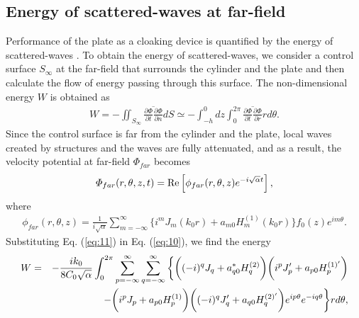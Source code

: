 \documentclass{jfm}
\def\f{\frac}
\def\a{\alpha}
\begin{document}
\subsection{Energy of scattered-waves at far-field}
Performance of the plate as a cloaking device is quantified by the energy of scattered-waves \cite[]{Iida2014}.
To obtain the energy of scattered-waves, we consider a control surface $S_\infty$ at the far-field that surrounds the cylinder and the plate and then calculate the flow of energy passing through this surface.
The non-dimensional energy $W$ is obtained \cite[]{Maruo1960, Kashiwagi2005} as
\begin{eqnarray}
\displaystyle W=-\iint_{S_\infty}\overline{\frac{\partial \Phi}{\partial t}\frac{\partial \Phi}{\partial n}}dS
\simeq -\int_{-h}^0dz \int_0^{2\pi}\overline{\frac{\partial \Phi}{\partial t}\frac{\partial \Phi}{\partial r}}rd\theta.
\label{eq:10}
\end{eqnarray}
Since the control surface is far from the cylinder and the plate, local waves created by structures and the waves are fully attenuated, and as a result, the velocity potential at far-field $\Phi_{far}$ becomes
\begin{eqnarray}
\displaystyle   \Phi_{far}(r,\theta,z,t) = {\rm Re} \left[  \phi_{far}(r,\theta,z)e^{-i  \sqrt{\a} t}  \right], 
\label{eq:11}
\end{eqnarray}
where
\begin{eqnarray}
\displaystyle   \phi_{far}(r,\theta,z) = \f{1}{i \sqrt{\a}} \sum_{m=-\infty}^{\infty} \bigg\{  i^mJ_m(k_0r)+a_{m0}H_m^{(1)}(k_0r)\bigg\}f_0(z) 
   e^{im\theta}.
\label{eq:12}
\end{eqnarray}
Substituting Eq. (\ref{eq:11}) in Eq. (\ref{eq:10}), we find the energy 
\begin{eqnarray}
\displaystyle W&=&-\frac{ik_0}{8C_0\sqrt{\alpha}}\int_0^{2\pi} \sum_{p=-\infty}^\infty\sum_{q=-\infty}^\infty
\bigg\{\bigg( (-i)^qJ_q+a_{q0}^*H_q^{(2)}\bigg)\bigg(i^pJ_p'+a_{p0} H_p^{(1)'}\bigg) \nonumber\\
\displaystyle &&-\bigg(i^pJ_p+a_{p0}H_p^{(1)}\bigg)\bigg((-i)^qJ_q'+a_{q0}H_q^{(2)'} \bigg)
 e^{ip\theta}e^{-iq\theta}\bigg\}rd\theta,
\label{eq:13}
\end{eqnarray}
\end{document}
